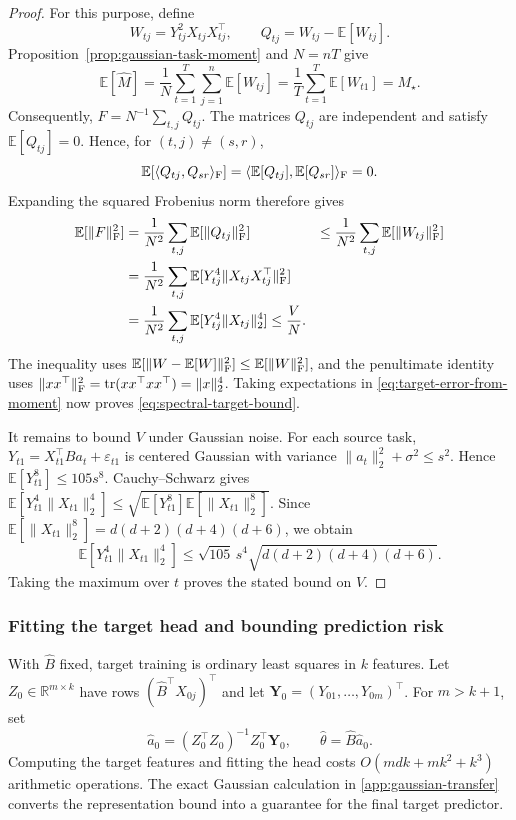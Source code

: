 \documentclass[11pt,twoside]{article}
\newcommand{\E}{\mathbb E}
\newcommand{\R}{\mathbb R}
\theoremstyle{definition}
\theoremstyle{remark}
\begin{document}
\begin{proof}
For this purpose, define
\[
 W_{tj}=Y_{tj}^2X_{tj}X_{tj}^\top,
 \qquad
 Q_{tj}
 =W_{tj}-\E[W_{tj}].
\]
Proposition~\ref{prop:gaussian-task-moment} and $N=nT$ give
\[
 \E[\widehat M]
 =\frac1N\sum_{t=1}^T\sum_{j=1}^n\E[W_{tj}]
 =\frac1T\sum_{t=1}^T\E[W_{t1}]
 =M_\star.
\]
Consequently, $F=N^{-1}\sum_{t,j}Q_{tj}$.
The matrices $Q_{tj}$ are independent and satisfy $\E[Q_{tj}]=0$. Hence,
for $(t,j)\ne(s,r)$,
\[
 \E[\langle Q_{tj},Q_{sr}\rangle_{\rm F}]
 =\langle\E[Q_{tj}],\E[Q_{sr}]\rangle_{\rm F}=0.
\]
Expanding the squared Frobenius norm therefore gives
\begin{align*}
 \E[\|F\|_{\rm F}^2]
 &=\frac1{N^2}\sum_{t,j}
   \E[\|Q_{tj}\|_{\rm F}^2]
 &\le\frac1{N^2}\sum_{t,j}\E[\|W_{tj}\|_{\rm F}^2]\\
 &=\frac1{N^2}\sum_{t,j}
   \E[Y_{tj}^4\|X_{tj}X_{tj}^\top\|_{\rm F}^2]\\
 &=\frac1{N^2}\sum_{t,j}
   \E[Y_{tj}^4\|X_{tj}\|_2^4]
 \le\frac VN.
\end{align*}
The inequality uses
$\E[\|W-\E[W]\|_{\rm F}^2]\le\E[\|W\|_{\rm F}^2]$, and the penultimate
identity uses
$\|xx^\top\|_{\rm F}^2=\operatorname{tr}(xx^\top xx^\top)=\|x\|_2^4$.
Taking expectations in \cref{eq:target-error-from-moment} now proves
\cref{eq:spectral-target-bound}.

It remains to bound $V$ under Gaussian noise. For each source task,
$Y_{t1}=X_{t1}^\top Ba_t+\varepsilon_{t1}$ is centered Gaussian with variance
$\|a_t\|_2^2+\sigma^2\le s^2$. Hence
$\E[Y_{t1}^8]\le105s^8$. Cauchy--Schwarz gives
$\E[Y_{t1}^4\|X_{t1}\|_2^4]
\le\sqrt{\E[Y_{t1}^8]\E[\|X_{t1}\|_2^8]}$.
Since $\E[\|X_{t1}\|_2^8]=d(d+2)(d+4)(d+6)$, we obtain
\[
 \E[Y_{t1}^4\|X_{t1}\|_2^4]
 \le
 \sqrt{105}\,s^4\sqrt{d(d+2)(d+4)(d+6)}.
\]
Taking the maximum over $t$ proves the stated bound on $V$.
\end{proof}

\subsubsection{Fitting the target head and bounding prediction risk}

With $\widehat B$ fixed, target training is ordinary least squares in $k$
features. Let $Z_0\in\R^{m\times k}$ have rows
$(\widehat B^\top X_{0j})^\top$ and let
$\boldsymbol Y_0=(Y_{01},\ldots,Y_{0m})^\top$. For $m>k+1$, set
\begin{equation}
 \widehat a_0=(Z_0^\top Z_0)^{-1}Z_0^\top\boldsymbol Y_0,
 \qquad \widehat\theta=\widehat B\widehat a_0.
 \label{eq:linear-target-head}
\end{equation}
Computing the target features and fitting the head costs
$O(mdk+mk^2+k^3)$ arithmetic operations. The exact Gaussian calculation in
\cref{app:gaussian-transfer} converts the representation bound into a
guarantee for the final target predictor.
\end{document}
